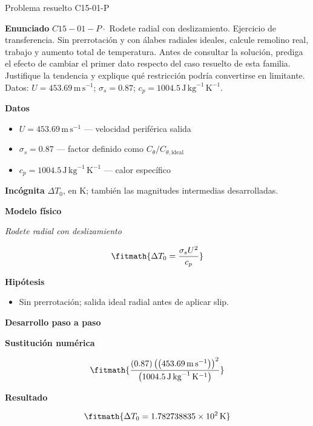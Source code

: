 \documentclass[10pt,openany]{book}
\begin{document}
\begin{studiumworked}{Problema resuelto C15-01-P}


\noindent\textbf{Enunciado}
\(C15-01-P \cdot\) Rodete radial con deslizamiento. Ejercicio de transferencia. Sin prerrotación y con álabes radiales ideales, calcule remolino real, trabajo y aumento total de temperatura. Antes de consultar la solución, prediga el efecto de cambiar el primer dato respecto del caso resuelto de esta familia. Justifique la tendencia y explique qué restricción podría convertirse en limitante. Datos: \(U=453.69\, \mathrm{m}\,\mathrm{s}^{-1}\); \(\sigma_s=0.87\); \(c_p=1004.5\, \mathrm{J}\,\mathrm{kg}^{-1}\,\mathrm{K}^{-1}\).

\noindent\textbf{Datos}
\begin{itemize}
\item $U = 453.69\,\mathrm{m}\,\mathrm{s}^{-1}$ — velocidad periférica salida
\item $\sigma_s = 0.87$ — factor definido como $C_\theta/C_{\theta,\mathrm{ideal}}$
\item $c_p = 1004.5\,\mathrm{J}\,\mathrm{kg}^{-1}\,\mathrm{K}^{-1}$ — calor específico
\end{itemize}

\noindent\textbf{Incógnita}
$\Delta T_0$, en $\mathrm{K}$; también las magnitudes intermedias desarrolladas.

\noindent\textbf{Modelo físico}

\noindent\textit{Rodete radial con deslizamiento}

\[
\fitmath{\Delta T_0=\frac{\sigma_s U^{2}}{c_p}}
\]

\noindent\textbf{Hipótesis}
\begin{itemize}
\item Sin prerrotación; salida ideal radial antes de aplicar slip.
\end{itemize}

\noindent\textbf{Desarrollo paso a paso}



\noindent\textbf{Sustitución numérica}

\[
\fitmath{\frac{\left(0.87\right) \left(\left(453.69\,\mathrm{m}\,\mathrm{s}^{-1}\right)\right)^{2}}{\left(1004.5\,\mathrm{J}\,\mathrm{kg}^{-1}\,\mathrm{K}^{-1}\right)}}
\]

\noindent\textbf{Resultado}

\[
\fitmath{\Delta T_0=1.782738835\times10^{2}\,\mathrm{K}}
\]


\end{studiumworked}
\end{document}
